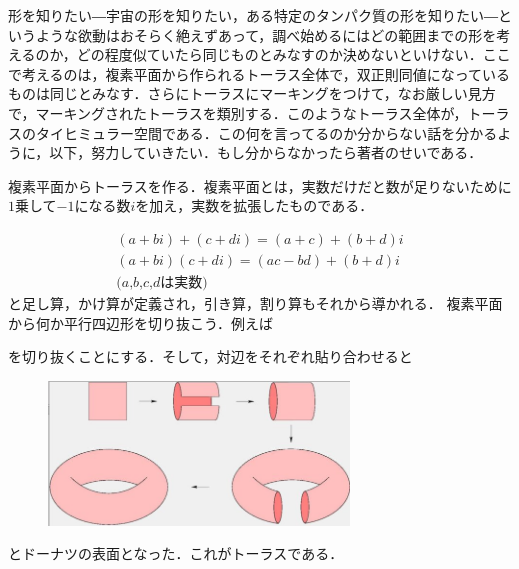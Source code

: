 


形を知りたい―宇宙の形を知りたい，ある特定のタンパク質の形を知りたい―というような欲動はおそらく絶えずあって，調べ始めるにはどの範囲までの形を考えるのか，どの程度似ていたら同じものとみなすのか決めないといけない．ここで考えるのは，複素平面から作られるトーラス全体で，双正則同値になっているものは同じとみなす．さらにトーラスにマーキングをつけて，なお厳しい見方で，マーキングされたトーラスを類別する．このようなトーラス全体が，トーラスのタイヒミュラー空間である．この何を言ってるのか分からない話を分かるように，以下，努力していきたい．もし分からなかったら著者のせいである．

複素平面からトーラスを作る．複素平面とは，実数だけだと数が足りないために$1$乗して$-1$になる数$i$を加え，実数を拡張したものである．


\begin{gather*}
(a+bi)+(c+di)=(a+c)+(b+d)i \\
(a+bi)(c+di)=(ac-bd)+(b+d)i \\
\text{($a$,$b$,$c$,$d$は実数)}
\end{gather*}
と足し算，かけ算が定義され，引き算，割り算もそれから導かれる．
複素平面から何か平行四辺形を切り抜こう．例えば\\

を切り抜くことにする．そして，対辺をそれぞれ貼り合わせると
\\
\begin{figure}[h]
\includegraphics[width=8cm]{asaka3.png}
\end{figure}
とドーナツの表面となった．これがトーラスである．

